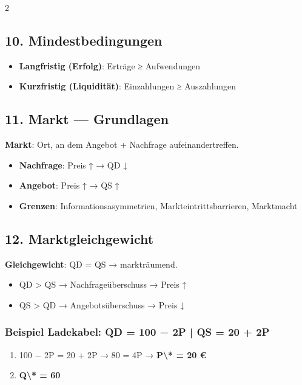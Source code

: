 \documentclass[10pt, a4paper]{article}
\begin{document}
\begin{multicols}{2}
\subsection{10. Mindestbedingungen}

\begin{itemize}
  \item \textbf{Langfristig (Erfolg)}: Erträge ≥ Aufwendungen
  \item \textbf{Kurzfristig (Liquidität)}: Einzahlungen ≥ Auszahlungen
\end{itemize}


\subsection{11. Markt — Grundlagen}

\textbf{Markt}: Ort, an dem Angebot + Nachfrage aufeinandertreffen.

\begin{itemize}
  \item \textbf{Nachfrage}: Preis ↑ → QD ↓
  \item \textbf{Angebot}: Preis ↑ → QS ↑
  \item \textbf{Grenzen}: Informationsasymmetrien, Markteintrittsbarrieren, Marktmacht
\end{itemize}


\subsection{12. Marktgleichgewicht}

\textbf{Gleichgewicht}: QD = QS → markträumend.

\begin{itemize}
  \item QD > QS → Nachfrageüberschuss → Preis ↑
  \item QS > QD → Angebotsüberschuss → Preis ↓
\end{itemize}


\subsubsection{Beispiel Ladekabel: QD = 100 − 2P | QS = 20 + 2P}
\begin{enumerate}
  \item 100 − 2P = 20 + 2P → 80 = 4P → \textbf{P\textbackslash{}* = 20 €}
  \item \textbf{Q\textbackslash{}* = 60}
\end{enumerate}



\end{multicols}
\end{document}
